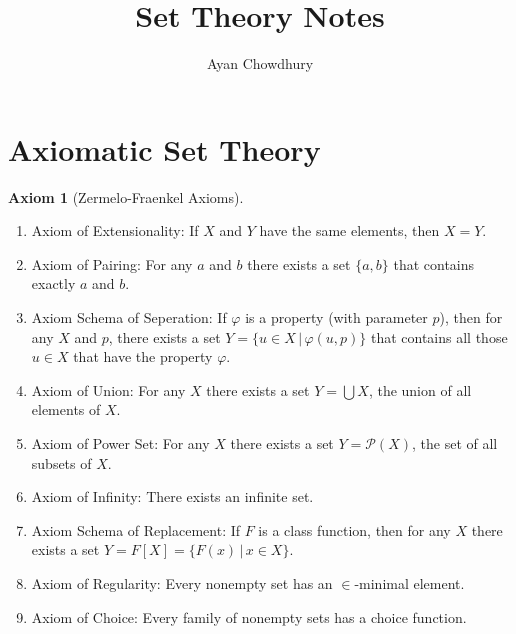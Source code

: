\documentclass{article}
\title{Set Theory Notes}
\author{Ayan Chowdhury}
\date{}
\theoremstyle{definition}
\newtheorem{axm}[thm]{Axiom}
\newcommand{\powset}[1]{\mathcal{P}(#1)}
\begin{document}
\maketitle

\tableofcontents

\newpage

\section{Axiomatic Set Theory}

\begin{axm}[Zermelo-Fraenkel Axioms]
    \hfill
    \begin{enumerate}[I]
        \item Axiom of Extensionality: If $X$ and $Y$ have the same elements, then $X = Y$.

        \item Axiom of Pairing: For any $a$ and $b$ there exists a set $\{a, b\}$ that contains exactly $a$ and $b$.

        \item Axiom Schema of Seperation: If $\varphi$ is a property (with parameter $p$), then for any $X$ and $p$, there exists a set $Y = \{u \in X \, | \, \varphi(u, p)\}$ that contains all those $u \in X$ that have the property $\varphi$.
        
        \item Axiom of Union: For any $X$ there exists a set $Y = \bigcup X$, the union of all elements of $X$.

        \item Axiom of Power Set: For any $X$ there exists a set $Y = \powset{X}$, the set of all subsets of $X$.

        \item Axiom of Infinity: There exists an infinite set.

        \item Axiom Schema of Replacement: If $F$ is a class function, then for any $X$ there exists a set $Y = F[X] = \{F(x) \, | \, x \in X\}$.

        \item Axiom of Regularity: Every nonempty set has an $\in$-minimal element.

        \item Axiom of Choice: Every family of nonempty sets has a choice function.
    \end{enumerate}
\end{axm}
\end{document}
